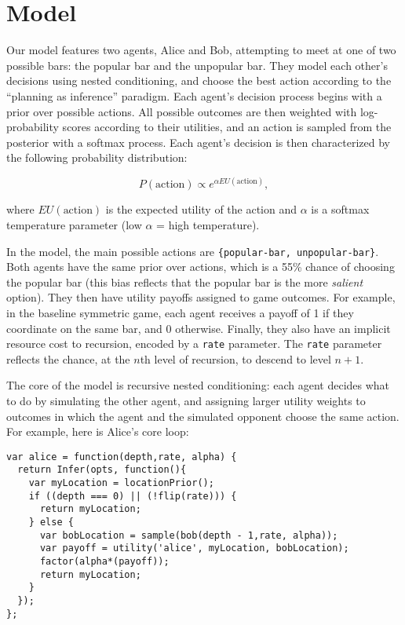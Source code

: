 \section{Model}\label{model}

Our model features two agents, Alice and Bob, attempting to meet at one
of two possible bars: the popular bar and the unpopular bar. They model
each other's decisions using nested conditioning, and choose the best
action according to the ``planning as inference'' paradigm. Each agent's
decision process begins with a prior over possible actions. All possible
outcomes are then weighted with log-probability scores according to
their utilities, and an action is sampled from the posterior with a
softmax process. Each agent's decision is then characterized by the
following probability distribution:

\[P(\text{action}) \propto e^{\alpha EU(\text{action})},\]

where \(EU(\text{action})\) is the expected utility of the action and
\(\alpha\) is a softmax temperature parameter (low \(\alpha\) = high
temperature).

In the model, the main possible actions are
\texttt{\{\textquotesingle{}popular-bar\textquotesingle{},\ \textquotesingle{}unpopular-bar\textquotesingle{}\}}.
Both agents have the same prior over actions, which is a 55\% chance of
choosing the popular bar (this bias reflects that the popular bar is the
more \emph{salient} option). They then have utility payoffs assigned to
game outcomes. For example, in the baseline symmetric game, each agent
receives a payoff of 1 if they coordinate on the same bar, and 0
otherwise. Finally, they also have an implicit resource cost to
recursion, encoded by a \texttt{rate} parameter. The \texttt{rate}
parameter reflects the chance, at the \(n\)th level of recursion, to
descend to level \(n+1\).

The core of the model is recursive nested conditioning: each agent
decides what to do by simulating the other agent, and assigning larger
utility weights to outcomes in which the agent and the simulated
opponent choose the same action. For example, here is Alice's core loop:

\begin{verbatim}
var alice = function(depth,rate, alpha) {
  return Infer(opts, function(){
    var myLocation = locationPrior();
    if ((depth === 0) || (!flip(rate))) {
      return myLocation;
    } else {
      var bobLocation = sample(bob(depth - 1,rate, alpha));
      var payoff = utility('alice', myLocation, bobLocation);
      factor(alpha*(payoff));
      return myLocation;
    }
  });
};
\end{verbatim}

